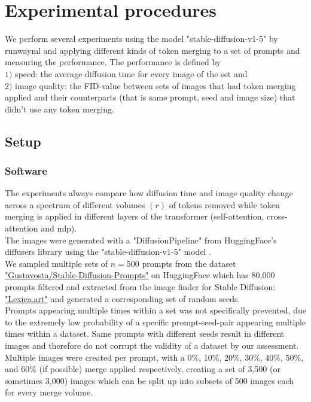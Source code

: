 \section{Experimental procedures}
We perform several experiments using the model "stable-diffusion-v1-5" by runwayml \cite{Rombach_2022_CVPR} and applying different kinds of token merging to a set of prompts and measuring the performance.
The performance is defined by\\ 
\(1)\) speed: the average diffusion time for every image of the set and\\
\(2)\) image quality: the FID-value between sets of images that had token merging applied and their counterparts (that is same prompt, seed and image size) that didn't use any token merging.

\subsection{Setup}
\subsubsection*{Software}
The experiments always compare how diffusion time and image quality change across a spectrum of different volumes \((r)\) of tokens  removed while token merging is applied in different layers of the transformer (self-attention, cross-attention and mlp).\\
The images were generated with a "DiffusionPipeline" from HuggingFace's diffusers library \cite{von-platen-etal-2022-diffusers} using the "stable-diffusion-v1-5" model \cite{Rombach_2022_CVPR}.\\
We sampled multiple sets of \(n=500\) prompts from the dataset \href{https://huggingface.co/datasets/Gustavosta/Stable-Diffusion-Prompts}{"Gustavosta/Stable-Diffusion-Prompts"} on HuggingFace which has 80,000 prompts filtered and extracted from the image finder for Stable Diffusion: \href{https://lexica.art}{"Lexica.art"} and generated a corresponding set of random seeds.\\ 
Prompts appearing multiple times within a set was not specifically prevented, due to the extremely low probability of a specific prompt-seed-pair appearing multiple times within a dataset. Same prompts with different seeds result in different images and therefore do not corrupt the validity of a dataset by our assessment.\\
Multiple images were created per prompt, with a 0\%, 10\%, 20\%, 30\%, 40\%, 50\%, and 60\% (if possible) merge applied respectively, creating a set of 3,500 (or sometimes 3,000) images which can be split up into subsets of 500 images each for every merge volume.\\

